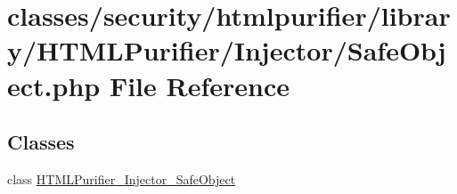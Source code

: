 \hypertarget{Injector_2SafeObject_8php}{\section{classes/security/htmlpurifier/library/\+H\+T\+M\+L\+Purifier/\+Injector/\+Safe\+Object.php File Reference}
\label{Injector_2SafeObject_8php}
}
\subsection*{Classes}
\begin{DoxyCompactItemize}
\item 
class \hyperlink{classHTMLPurifier__Injector__SafeObject}{H\+T\+M\+L\+Purifier\+\_\+\+Injector\+\_\+\+Safe\+Object}
\end{DoxyCompactItemize}
